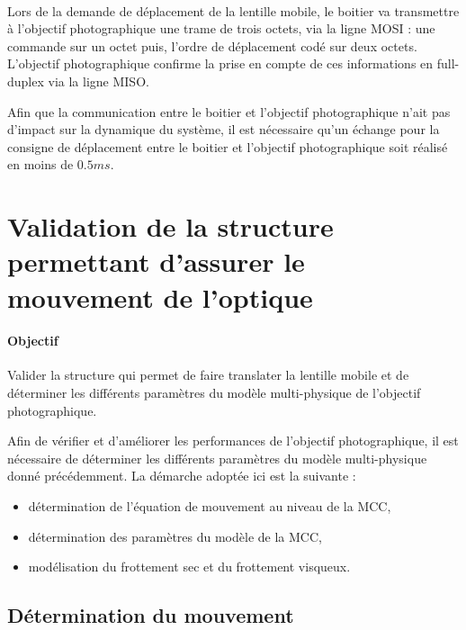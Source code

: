 ~\

Lors de la demande de déplacement de la lentille mobile, le boitier va transmettre à l'objectif photographique une trame de trois octets, via la ligne MOSI : une commande sur un octet puis, l'ordre de déplacement codé sur deux octets. L'objectif photographique confirme la prise en compte de ces informations en full-duplex via la ligne MISO.

Afin que la communication entre le boitier et l'objectif photographique n'ait pas d'impact sur la dynamique du système, il est nécessaire qu'un échange pour la consigne de déplacement entre le boitier et l'objectif photographique soit réalisé en moins de $0.5ms$.


\section{Validation de la structure permettant d'assurer le mouvement
de l'optique}

\paragraph{Objectif}

Valider la structure qui permet de faire translater la lentille mobile et de déterminer les différents paramètres du modèle multi-physique de l'objectif photographique.

Afin de vérifier et d'améliorer les performances de l'objectif photographique, il est nécessaire de déterminer les différents paramètres du modèle multi-physique donné précédemment. La démarche adoptée ici est la suivante :
\begin{itemize}
 \item détermination de l'équation de mouvement au niveau de la MCC,
 \item détermination des paramètres du modèle de la MCC,
 \item modélisation du frottement sec et du frottement visqueux.
\end{itemize}

\subsection{Détermination du mouvement}

